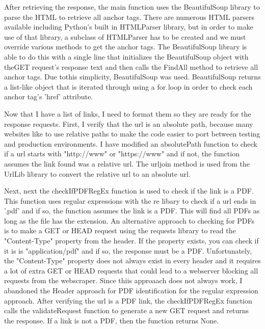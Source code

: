\documentclass[12pt]{article}
\begin{document}
After retrieving the response, the main function uses the BeautifulSoup library to parse the HTML to retrieve all anchor tags. There are numerous HTML parsers available including Python's built in HTMLParser library, but in order to make use of that library, a subclass of HTMLParser has to be created and we must override various methods to get the anchor tags. The BeautifulSoup library is able to do this with a single line that initializes the BeautifulSoup object with theGET request's response text and then calls the FindAll method to retrieve all anchor tags. Due tothis simplicity, BeautifulSoup was used.  BeautifulSoup returns a list-like object that is iterated through using a for loop in order to check each anchor tag's 'href' attribute. 

Now that I have a list of links, I need to format them so they are ready for the response requests. First, I verify that the url is an absolute path, because many websites like to use relative paths to make the code easier to port between testing and production environments. I have modified an absolutePath function \cite{stackOverflowRelativePath} to check if a url starts with "http://www" or "https://www" and if not, the function assumes the link found was a relative url. The urljoin method is used from the UrlLib library to convert the relative url to an absolute url.

Next, next the checkIfPDFRegEx function is used to check if the link is a PDF. This function uses regular expressions with the re libary to check if a url ends in '.pdf' and if so, the function assumes the link is a PDF. This will find all PDFs as long as the file has the extension. An alternative approach to checking for PDFs is to make a GET or HEAD request using the requests library to read the "Content-Type" property from the header.  If the property exists, you can check if it is is "application/pdf" and if so, the response must be a PDF. Unfortunately, the "Content-Type" property does not always exist in every header and it requires a lot of extra GET or HEAD requests that could lead to a webserver blocking all requests from the webscraper. Since thiis approaach does not always work, I abandoned the Header approach for PDF identification for the regular expression approach. After verifying the url is a PDF link, the checkIfPDFRegEx function calls the validateRequest function to generate a new GET request and returns the response. If a link is not a PDF, then the function returns None. 
\end{document}
